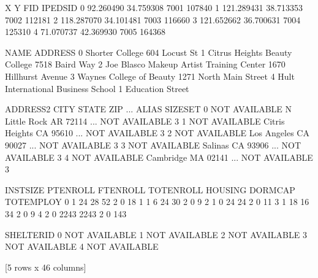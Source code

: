 \documentclass[letterpaper,10pt,english]{sphinxmanual}
\begin{document}
\begin{sphinxVerbatim}[commandchars=\\\{\}]
    
\end{sphinxVerbatim}

\begin{sphinxVerbatim}[commandchars=\\\{\}]
            X          Y   FID  IPEDSID  \PYGZbs{}
0  \PYGZhy{}92.260490  34.759308  7001   107840   
1 \PYGZhy{}121.289431  38.713353  7002   112181   
2 \PYGZhy{}118.287070  34.101481  7003   116660   
3 \PYGZhy{}121.652662  36.700631  7004   125310   
4  \PYGZhy{}71.070737  42.369930  7005   164368   

                                       NAME                 ADDRESS  \PYGZbs{}
0                           Shorter College           604 Locust St   
1             Citrus Heights Beauty College          7518 Baird Way   
2  Joe Blasco Makeup Artist Training Center   1670 Hillhurst Avenue   
3                  Waynes College of Beauty  1271 North Main Street   
4        Hult International Business School      1 Education Street   

        ADDRESS2            CITY STATE    ZIP  ...          ALIAS SIZE\PYGZus{}SET  \PYGZbs{}
0  NOT AVAILABLE   N Little Rock    AR  72114  ...  NOT AVAILABLE       \PYGZhy{}3   
1  NOT AVAILABLE  Citris Heights    CA  95610  ...  NOT AVAILABLE       \PYGZhy{}3   
2  NOT AVAILABLE     Los Angeles    CA  90027  ...  NOT AVAILABLE       \PYGZhy{}3   
3  NOT AVAILABLE         Salinas    CA  93906  ...  NOT AVAILABLE       \PYGZhy{}3   
4  NOT AVAILABLE       Cambridge    MA  02141  ...  NOT AVAILABLE       \PYGZhy{}3   

   INST\PYGZus{}SIZE PT\PYGZus{}ENROLL  FT\PYGZus{}ENROLL TOT\PYGZus{}ENROLL  HOUSING DORM\PYGZus{}CAP  TOT\PYGZus{}EMPLOY  \PYGZbs{}
0          1        24         28         52        2        0          18   
1          1         6         24         30        2        0           9   
2          1         0         24         24        2        0          11   
3          1        18         16         34        2        0           9   
4          2         0       2243       2243        2        0         143   

      SHELTER\PYGZus{}ID  
0  NOT AVAILABLE  
1  NOT AVAILABLE  
2  NOT AVAILABLE  
3  NOT AVAILABLE  
4  NOT AVAILABLE  

[5 rows x 46 columns]
\end{sphinxVerbatim}
\end{document}
